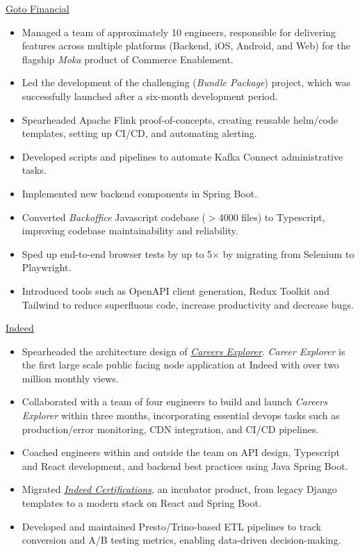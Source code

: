 \documentclass[]{cv} %
\begin{document}
\entry
{\href{https://gotofinancial.com/en}{Goto Financial}}
{
\begin{itemize}
\item Managed a team of approximately 10 engineers, responsible for delivering features across multiple platforms (Backend, iOS, Android, and Web) for the flagship \emph{Moka} product of Commerce Enablement.
\item Led the development of the challenging (\emph{Bundle Package}) project, which was successfully launched after a six-month development period.
\item Spearheaded Apache Flink proof-of-concepts, creating reusable helm/code templates, setting up CI/CD, and automating alerting.
\item Developed scripts and pipelines to automate Kafka Connect administrative tasks.
\item Implemented new backend components in Spring Boot.
\item Converted \emph{Backoffice} Javascript codebase ($> $4000 files) to Typescript, improving codebase maintainability and reliability.
\item Sped up end-to-end browser tests by up to 5$\times$ by migrating from Selenium to Playwright.
\item Introduced tools such as OpenAPI client generation, Redux Toolkit and Tailwind to reduce superfluous code, increase productivity and decrease bugs.
\end{itemize}
}

\entry
{\href{https://www.indeed.com/}{Indeed}}
{
\begin{itemize}
\item Spearheaded the architecture design of \href{https://www.indeed.com/career}{\emph{Careers Explorer}}. \emph{Career Explorer} is the first large scale public facing node application at Indeed with over two million monthly views.
\item Collaborated with a team of four engineers to build and launch \emph{Careers Explorer} within three months, incorporating essential devops tasks such as production/error monitoring, CDN integration, and CI/CD pipelines.
\item Coached engineers within and outside the team on API design, Typescript and React development, and backend best practices using Java Spring Boot.
\item Migrated \href{https://www.indeed.com/certifications/}{\emph{Indeed Certifications}}, an incubator product, from legacy Django templates to a modern stack on React and Spring Boot.
\item Developed and maintained Presto/Trino-based ETL pipelines to track conversion and A/B testing metrics, enabling data-driven decision-making.
\end{itemize}
}
\end{document}
